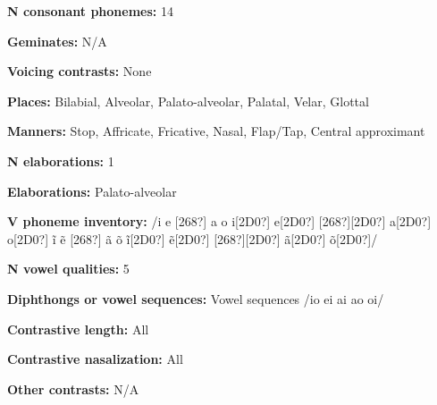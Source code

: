 \begin{styleBody}
\textbf{N consonant phonemes:} 14
\end{styleBody}

\begin{styleBody}
\textbf{Geminates:} N/A
\end{styleBody}

\begin{styleBody}
\textbf{Voicing contrasts:} None
\end{styleBody}

\begin{styleBody}
\textbf{Places:} Bilabial, Alveolar, Palato-alveolar, Palatal, Velar, Glottal
\end{styleBody}

\begin{styleBody}
\textbf{Manners:} Stop, Affricate, Fricative, Nasal, Flap/Tap, Central approximant
\end{styleBody}

\begin{styleBody}
\textbf{N elaborations:} 1
\end{styleBody}

\begin{styleBody}
\textbf{Elaborations:} Palato-alveolar
\end{styleBody}

\begin{styleBody}
\textbf{V phoneme inventory:} /i e [268?] a o i[2D0?] e[2D0?] [268?][2D0?] a[2D0?] o[2D0?] \~{i} \~{e} [268?] \~{a} \~{o} \~{i}[2D0?] \~{e}[2D0?] [268?][2D0?] \~{a}[2D0?] \~{o}[2D0?]/
\end{styleBody}

\begin{styleBody}
\textbf{N vowel qualities:} 5
\end{styleBody}

\begin{styleBody}
\textbf{Diphthongs or vowel sequences:} Vowel sequences /io ei ai ao oi/
\end{styleBody}

\begin{styleBody}
\textbf{Contrastive length:} All
\end{styleBody}

\begin{styleBody}
\textbf{Contrastive nasalization:} All
\end{styleBody}

\begin{styleBody}
\textbf{Other contrasts:} N/A
\end{styleBody}

